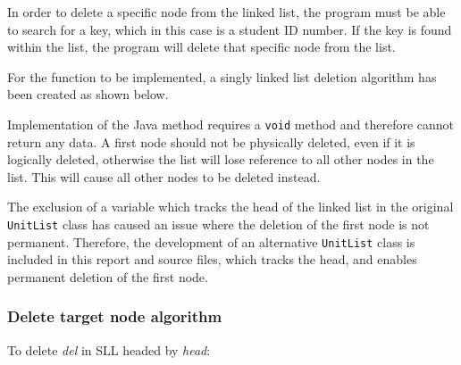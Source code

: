 In order to delete a specific node from the linked list, the program must be able to search for a key, which in this case is a student ID number. If the key is found within the list, the program will delete that specific node from the list.

For the function to be implemented, a singly linked list deletion algorithm has been created as shown below.

Implementation of the Java method requires a \texttt{void} method and therefore cannot return any data. A first node should not be physically deleted, even if it is logically deleted, otherwise the list will lose reference to all other nodes in the list. This will cause all other nodes to be deleted instead.

The exclusion of a variable which tracks the head of the linked list in the original \texttt{UnitList} class has caused an issue where the deletion of the first node is not permanent. Therefore, the development of an alternative \texttt{UnitList} class is included in this report and source files, which tracks the head, and enables permanent deletion of the first node.

\subsubsection{Delete target node algorithm}



To delete \emph{del} in SLL headed by \emph{head}:

